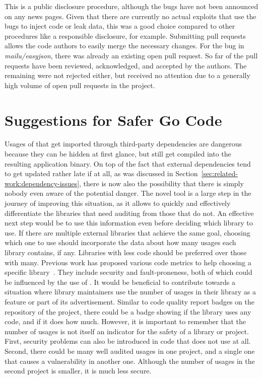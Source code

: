 

This is a public disclosure procedure, although the bugs have not been announced on any news pages.
Given that there are currently no actual exploits that use the bugs to inject code or leak data, this was a good choice
compared to other procedures like a responsible disclosure, for example.
Submitting \github{} pull requests allows the code authors to easily merge the necessary changes.
For the bug in \textit{mailu/easyjson}, there was already an existing open pull request.
So far \numberPRsMerged{} of the pull requests have been reviewed, acknowledged, and accepted by the authors.
The remaining were not rejected either, but received no attention due to a generally high volume of open pull requests
in the project.



\section{Suggestions for Safer Go Code}\label{sec:discussion:safer-go-code}

Usages of \unsafe{} that get imported through third-party dependencies are dangerous because they can be hidden at first
glance, but still get compiled into the resulting application binary.
On top of the fact that external dependencies tend to get updated rather late if at all, as was discussed in
Section~\ref{sec:related-work:dependency-issues}, there is now also the possibility that there is simply nobody even
aware of the potential danger.
The novel tool \toolGeiger{} is a large step in the journey of improving this situation, as it allows to quickly and
effectively differentiate the libraries that need auditing from those that do not.
An effective next step would be to use this information even before deciding which library to use.
If there are multiple external libraries that achieve the same goal, choosing which one to use should incorporate the
data about how many \unsafe{} usages each library contains, if any.
Libraries with less \unsafe{} code should be preferred over those with many.
Previous work has proposed various code metrics to help choosing a specific library~\cite{delamora2018}.
They include security and fault-proneness, both of which could be influenced by the use of \unsafe{}.
It would be beneficial to contribute towards a situation where library maintainers use the number of \unsafe{} usages
in their library as a feature or part of its advertisement.
Similar to code quality report badges on the \github{} repository of the project, there could be a badge showing if the
library uses any \unsafe{} code, and if it does how much.
However, it is important to remember that the number of \unsafe{} usages is not itself an indicator for the safety of
a library or project.
First, security problems can also be introduced in code that does not use \unsafe{} at all.
Second, there could be many well audited \unsafe{} usages in one project, and a single one that causes a vulnerability
in another one.
Although the number of \unsafe{} usages in the second project is smaller, it is much less secure.

